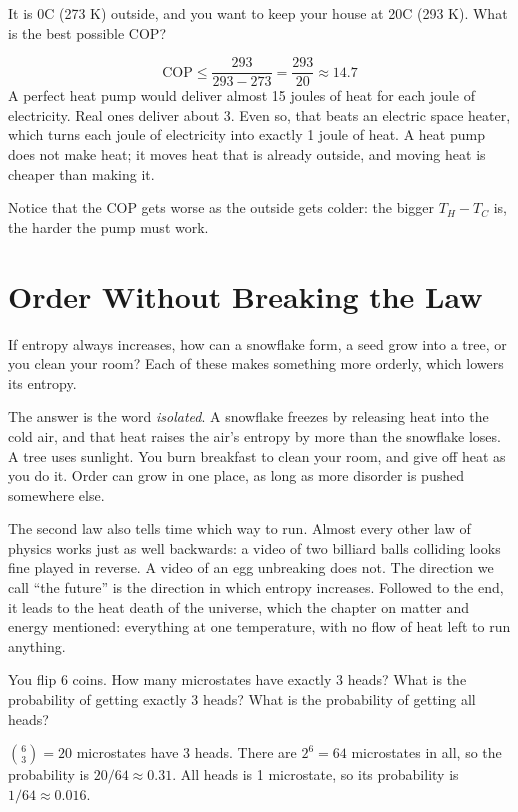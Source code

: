 \begin{Worked}
\begin{Problem}
It is 0\textdegree C (273 K) outside, and you want to keep your house at 20\textdegree C
(293 K). What is the best possible COP?
\end{Problem}
\begin{Solution}
$$\text{COP} \leq \frac{293}{293 - 273} = \frac{293}{20} \approx 14.7$$
A perfect heat pump would deliver almost 15 joules of heat for each joule of electricity. Real ones
deliver about 3. Even so, that beats an electric space heater, which turns each joule of electricity into
exactly 1 joule of heat. A heat pump does not make heat; it moves heat that is already outside, and
moving heat is cheaper than making it.
\end{Solution}
\end{Worked}

Notice that the COP gets worse as the outside gets colder: the bigger $T_H - T_C$ is, the harder the pump
must work.

\section{Order Without Breaking the Law}
If entropy always increases, how can a snowflake form, a seed grow into a tree, or you clean your room?
Each of these makes something more orderly, which lowers its entropy.

The answer is the word \emph{isolated}. A snowflake freezes by releasing heat into the cold air, and
that heat raises the air's entropy by more than the snowflake loses. A tree uses sunlight. You burn
breakfast to clean your room, and give off heat as you do it. Order can grow in one place, as long as
more disorder is pushed somewhere else.

The second law also tells time which way to run. Almost every other law of physics works just as well
backwards: a video of two billiard balls colliding looks fine played in reverse. A video of an egg unbreaking does not. The
direction we call ``the future'' is the direction in which entropy increases. Followed to the end, it
leads to the heat death of the universe, which the chapter on matter and energy mentioned: everything
at one temperature, with no flow of heat left to run anything.

\begin{Exercise}[title={Six Coins}, label=sl_coins]
You flip 6 coins. How many microstates have exactly 3 heads? What is the probability of getting exactly
3 heads? What is the probability of getting all heads?
\end{Exercise}
\begin{Answer}[ref=sl_coins]
$\binom{6}{3} = 20$ microstates have 3 heads. There are $2^6 = 64$ microstates in all, so the probability
is $20/64 \approx 0.31$. All heads is 1 microstate, so its probability is $1/64 \approx 0.016$.
\end{Answer}


